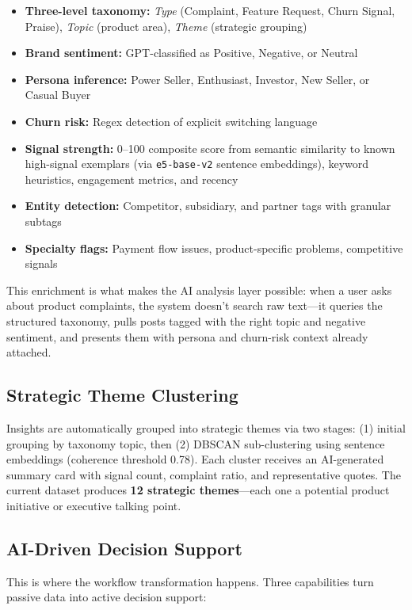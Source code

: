 \documentclass[11pt]{article}
\begin{document}
\begin{itemize}[nosep]
    \item \textbf{Three-level taxonomy:} \textit{Type} (Complaint, Feature Request, Churn Signal, Praise), \textit{Topic} (product area), \textit{Theme} (strategic grouping)
    \item \textbf{Brand sentiment:} GPT-classified as Positive, Negative, or Neutral
    \item \textbf{Persona inference:} Power Seller, Enthusiast, Investor, New Seller, or Casual Buyer
    \item \textbf{Churn risk:} Regex detection of explicit switching language
    \item \textbf{Signal strength:} 0--100 composite score from semantic similarity to known high-signal exemplars (via \texttt{e5-base-v2} sentence embeddings), keyword heuristics, engagement metrics, and recency
    \item \textbf{Entity detection:} Competitor, subsidiary, and partner tags with granular subtags
    \item \textbf{Specialty flags:} Payment flow issues, product-specific problems, competitive signals
\end{itemize}

This enrichment is what makes the AI analysis layer possible: when a user asks about product complaints, the system doesn't search raw text---it queries the structured taxonomy, pulls posts tagged with the right topic and negative sentiment, and presents them with persona and churn-risk context already attached.

\subsection{Strategic Theme Clustering}
Insights are automatically grouped into strategic themes via two stages: (1) initial grouping by taxonomy topic, then (2) DBSCAN sub-clustering using sentence embeddings (coherence threshold 0.78). Each cluster receives an AI-generated summary card with signal count, complaint ratio, and representative quotes. The current dataset produces \textbf{12 strategic themes}---each one a potential product initiative or executive talking point.

\subsection{AI-Driven Decision Support}
\label{sec:ai}

This is where the workflow transformation happens. Three capabilities turn passive data into active decision support:
\end{document}
